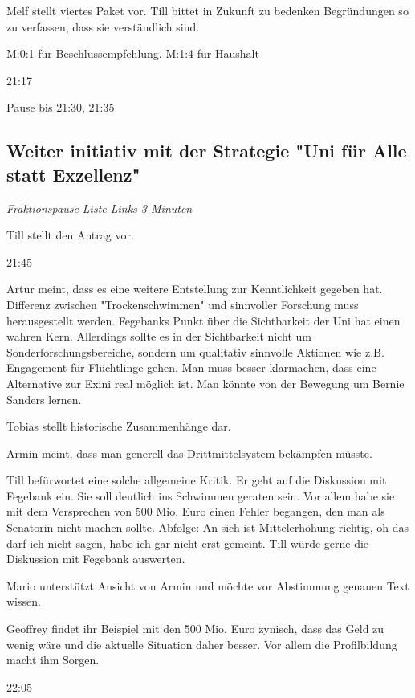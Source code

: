 \documentclass[ngerman,headheight=70pt]{scrartcl}
\begin{document}
    Melf stellt viertes Paket vor. Till bittet in Zukunft zu bedenken Begründungen
    so zu verfassen, dass sie verständlich sind.

    M:0:1 für Beschlussempfehlung.
    M:1:4 für Haushalt

    21:17

    Pause bis 21:30, 21:35

    \subsection{Weiter initiativ mit der Strategie "Uni für Alle statt Exzellenz"}

    \textit{Fraktionspause Liste Links 3 Minuten}

    Till stellt den Antrag vor.

    21:45

    Artur meint, dass es eine weitere Entstellung zur Kenntlichkeit
    gegeben hat.
    Differenz zwischen "Trockenschwimmen" und sinnvoller Forschung muss
    herausgestellt werden. Fegebanks Punkt über die Sichtbarkeit der Uni hat
    einen wahren Kern. Allerdings sollte es in der Sichtbarkeit nicht um
    Sonderforschungsbereiche, sondern um qualitativ sinnvolle Aktionen wie z.B.
    Engagement für Flüchtlinge gehen.
    Man muss besser klarmachen, dass eine Alternative zur Exini real
    möglich ist. Man könnte von der Bewegung um Bernie Sanders lernen.

    Tobias stellt historische Zusammenhänge dar.

    Armin meint, dass man generell das Drittmittelsystem bekämpfen müsste.

    Till befürwortet eine solche allgemeine Kritik. Er geht auf die Diskussion
    mit Fegebank ein. Sie soll deutlich ins Schwimmen geraten sein. Vor allem
    habe sie mit dem Versprechen von 500 Mio. Euro einen Fehler begangen, den
    man als Senatorin nicht machen sollte. Abfolge:
    An sich ist Mittelerhöhung richtig, oh das darf ich nicht sagen, habe ich
    gar nicht erst gemeint.
    Till würde gerne die Diskussion mit Fegebank auswerten.

    Mario unterstützt Ansicht von Armin und möchte vor Abstimmung genauen
    Text wissen.

    Geoffrey findet ihr Beispiel mit den 500 Mio. Euro zynisch, dass das Geld
    zu wenig wäre und die aktuelle Situation daher besser. Vor allem die Profilbildung
    macht ihm Sorgen.

    22:05
\end{document}
